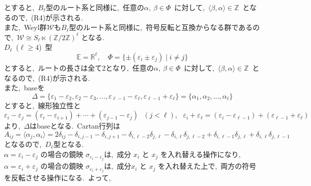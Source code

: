 \documentclass[uplatex,dvipdfmx]{jsarticle}
\begin{document}
\begin{myproof}
\begin{equation*}
    \end{equation*}
    とすると,~$B_\ell$型のルート系と同様に,~任意の$\alpha,~\beta \in \Phi$~に対して,~$\langle \beta, \alpha \rangle \in \mathbb{Z}$~となるので,~(R4)が示される.~\\
    また,~Weyl群$\mathscr{W}$も$B_\ell$型のルート系と同様に,~符号反転と互換からなる群であるので,~$\mathscr{W} \cong S_\ell \ltimes (\mathbb{Z}/2\mathbb{Z})^\ell$ となる.\\
    $D_\ell$~($\ell \geq 4$)~型\\
    \begin{equation*}
        \mathbb{E} = \mathbb{R}^\ell, \quad \Phi = \{\pm (\varepsilon_i \pm \varepsilon_j) \mid i \neq j\}
    \end{equation*}
    とすると,~ルートの長さは全て2となり,~任意の$\alpha,~\beta \in \Phi$~に対して,~$\langle \beta, \alpha \rangle \in \mathbb{Z}$~となるので,~(R4)が示される.~\\
    また,~baseを
    \begin{equation*}
        \Delta = \{\varepsilon_1 - \varepsilon_2, \varepsilon_2 - \varepsilon_3, \dots, \varepsilon_{\ell-1} - \varepsilon_\ell, \varepsilon_{\ell-1} + \varepsilon_\ell\} = \{\alpha_1, \alpha_2, \dots, \alpha_\ell\}
    \end{equation*}
    とすると,~線形独立性と
    \begin{equation*}
        \varepsilon_i - \varepsilon_j = (\varepsilon_i - \varepsilon_{i+1}) + \cdots + (\varepsilon_{j-1} - \varepsilon_j)~~~(j < \ell),~~~\varepsilon_i + \varepsilon_\ell = (\varepsilon_i - \varepsilon_{\ell-1}) +(\varepsilon_{\ell-1} + \varepsilon_\ell)
    \end{equation*}
    より,~$\Delta$はbaseとなる.~Cartan行列は
   \begin{equation*}
        A_{ij} = \langle \alpha_j, \alpha_i \rangle = 2 \delta_{ij} - \delta_{i, j-1} - \delta_{i, j+1} - \delta_{i, \ell-2}\delta_{j, \ell} - \delta_{i, \ell}\delta_{j, \ell-2} + \delta_{i, \ell-1}\delta_{j, \ell} + \delta_{i, \ell}\delta_{j, \ell-1}
   \end{equation*}
   となるので,~$D_\ell$型となる.~\\
   $\alpha = \varepsilon_i - \varepsilon_j$ の場合の鏡映 $\sigma_{\varepsilon_i - \varepsilon_j}$は,~成分 $x_i$ と $x_j$ を入れ替える操作になり,~$\alpha = \varepsilon_i + \varepsilon_j$ の場合の鏡映 $\sigma_{\varepsilon_i + \varepsilon_j}$は,~成分$x_i$ と $x_j$ を入れ替えた上で,~両方の符号を反転させる操作になる.~よって,~
   \begin{equation*}

\end{equation*}
\end{myproof}
\end{document}
